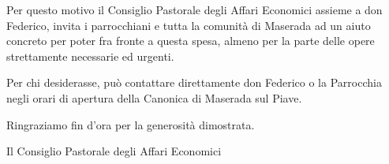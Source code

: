 Per questo motivo il Consiglio Pastorale degli Affari Economici assieme a don Federico, invita i parrocchiani e tutta la comunità di Maserada ad un aiuto concreto per poter fra fronte a questa spesa, almeno per la parte delle opere strettamente necessarie ed urgenti.

Per chi desiderasse, può contattare direttamente don Federico o la Parrocchia negli orari di apertura della Canonica di Maserada sul Piave.

Ringraziamo fin d'ora per la generosità dimostrata.

Il Consiglio Pastorale degli Affari Economici


